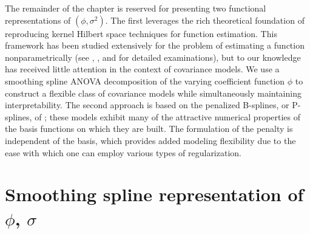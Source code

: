 The remainder of the chapter is reserved for presenting two functional representations of $\left(\phi, \sigma^2\right)$. The first leverages the rich theoretical foundation of reproducing kernel Hilbert space techniques for function estimation. This framework has been studied extensively for the problem of estimating a function nonparametrically (see \cite{aronszajn1950theory}, \cite{wahba1990spline}, and \cite{berlinet2011reproducing} for detailed examinations), but to our knowledge has received little attention in the context of covariance models. We use a smoothing spline ANOVA decomposition of the varying coefficient function $\phi$ to construct a flexible class of covariance models while simultaneously maintaining interpretability. The second approach is based on the penalized B-splines, or P-splines, of \cite{eilers1996flexible}; these models exhibit many of the attractive numerical properties of the basis functions on which they are built. The formulation of the penalty is independent of the basis, which provides added modeling flexibility due to the ease with which one can employ various types of regularization.




\section{Smoothing spline representation of $\phi$, $\sigma$}



